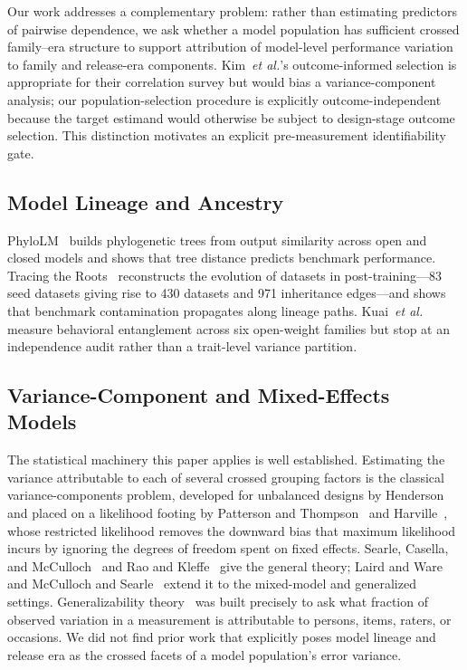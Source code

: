 \documentclass{ieeeaccess}
\theoremstyle{definition}
\theoremstyle{plain}
\begin{document}
Our work addresses a complementary problem: rather than estimating predictors of pairwise dependence, we ask whether a model population has sufficient crossed family--era structure to support attribution of model-level performance variation to family and release-era components. Kim~\textit{et al.}'s outcome-informed selection is appropriate for their correlation survey but would bias a variance-component analysis; our population-selection procedure is explicitly outcome-independent because the target estimand would otherwise be subject to design-stage outcome selection. This distinction motivates an explicit pre-measurement identifiability gate.

\subsection{Model Lineage and Ancestry}
PhyloLM~\cite{phylolm2024} builds phylogenetic trees from output similarity across open and closed models and shows that tree distance predicts benchmark performance. Tracing the Roots~\cite{li2026roots} reconstructs the evolution of datasets in post-training---83 seed datasets giving rise to 430 datasets and 971 inheritance edges---and shows that benchmark contamination propagates along lineage paths. Kuai~\textit{et al.}~\cite{kuai2026} measure behavioral entanglement across six open-weight families but stop at an independence audit rather than a trait-level variance partition.

\subsection{Variance-Component and Mixed-Effects Models}
The statistical machinery this paper applies is well established. Estimating the variance attributable to each of several crossed grouping factors is the classical variance-components problem, developed for unbalanced designs by Henderson~\cite{henderson1975} and placed on a likelihood footing by Patterson and Thompson~\cite{patterson1971} and Harville~\cite{harville1977}, whose restricted likelihood removes the downward bias that maximum likelihood incurs by ignoring the degrees of freedom spent on fixed effects. Searle, Casella, and McCulloch~\cite{searle1992} and Rao and Kleffe~\cite{rao1988} give the general theory; Laird and Ware~\cite{laird1982} and McCulloch and Searle~\cite{mcculloch2001} extend it to the mixed-model and generalized settings. Generalizability theory~\cite{brennan2001,cronbach1972} was built precisely to ask what fraction of observed variation in a measurement is attributable to persons, items, raters, or occasions. We did not find prior work that explicitly poses model lineage and release era as the crossed facets of a model population's error variance.
\end{document}
